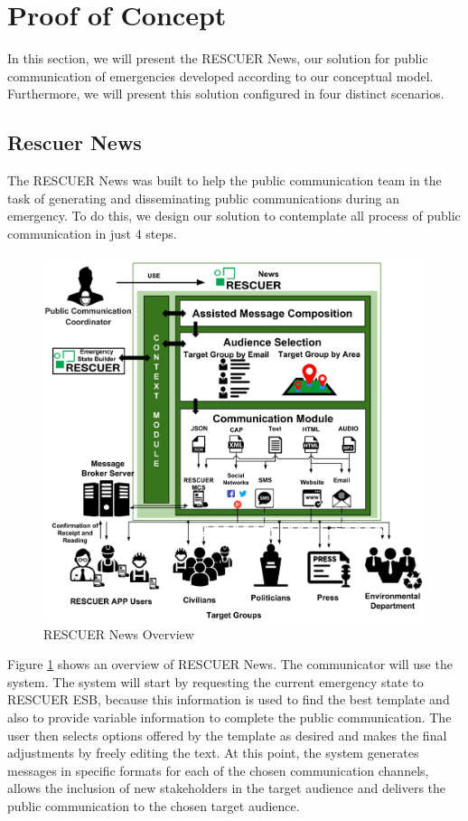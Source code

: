 \section{Proof of Concept}\label{sec:proofConcept}

In this section, we will present the RESCUER News, our solution for public communication of emergencies developed according to our conceptual model. Furthermore, we will present this solution configured in four distinct scenarios.

\subsection{Rescuer News}

The RESCUER News was built to help the public communication team in the task of generating and disseminating public communications during an emergency. To do this, we design our solution to contemplate all process of public communication in just 4 steps.

\begin{figure}
\centering
\includegraphics[width=\linewidth]{images/RescuerNewsConcept}
\caption{RESCUER News Overview}
\label{fig:rescuerOverview}
\end{figure} 

Figure \ref{fig:rescuerOverview} shows an overview of RESCUER News. The communicator will use the system. The
system will start by requesting the current emergency state to RESCUER ESB, because this
information is used to find the best template and also to provide variable information to complete
the public communication. The user then selects options offered by the template as desired and
makes the final adjustments by freely editing the text. At this point, the system generates messages
in specific formats for each of the chosen communication channels, allows the inclusion of new
stakeholders in the target audience and delivers the public communication to the chosen target
audience.

